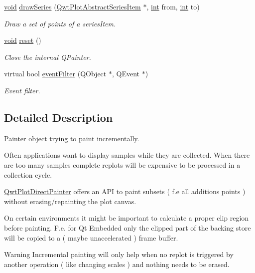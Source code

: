 \begin{DoxyCompactItemize}
\hyperlink{group___u_a_v_objects_plugin_ga444cf2ff3f0ecbe028adce838d373f5c}{void} \hyperlink{class_qwt_plot_direct_painter_a8db6c5b50478f4e2627f51135486ae40}{draw\-Series} (\hyperlink{class_qwt_plot_abstract_series_item}{Qwt\-Plot\-Abstract\-Series\-Item} $\ast$, \hyperlink{ioapi_8h_a787fa3cf048117ba7123753c1e74fcd6}{int} from, \hyperlink{ioapi_8h_a787fa3cf048117ba7123753c1e74fcd6}{int} to)
\begin{DoxyCompactList}\small\item\em Draw a set of points of a series\-Item. \end{DoxyCompactList}\item 
\hyperlink{group___u_a_v_objects_plugin_ga444cf2ff3f0ecbe028adce838d373f5c}{void} \hyperlink{class_qwt_plot_direct_painter_a895bf1ebfd772a2200dc09bed596cf4d}{reset} ()
\begin{DoxyCompactList}\small\item\em Close the internal Q\-Painter. \end{DoxyCompactList}\item 
virtual bool \hyperlink{class_qwt_plot_direct_painter_ab421bd757679b61f1dcfde2991500ab2}{event\-Filter} (Q\-Object $\ast$, Q\-Event $\ast$)
\begin{DoxyCompactList}\small\item\em Event filter. \end{DoxyCompactList}\end{DoxyCompactItemize}


\subsection{Detailed Description}
Painter object trying to paint incrementally. 

Often applications want to display samples while they are collected. When there are too many samples complete replots will be expensive to be processed in a collection cycle.

\hyperlink{class_qwt_plot_direct_painter}{Qwt\-Plot\-Direct\-Painter} offers an A\-P\-I to paint subsets ( f.\-e all additions points ) without erasing/repainting the plot canvas.

On certain environments it might be important to calculate a proper clip region before painting. F.\-e. for Qt Embedded only the clipped part of the backing store will be copied to a ( maybe unaccelerated ) frame buffer.

\begin{DoxyWarning}{Warning}
Incremental painting will only help when no replot is triggered by another operation ( like changing scales ) and nothing needs to be erased. 
\end{DoxyWarning}


